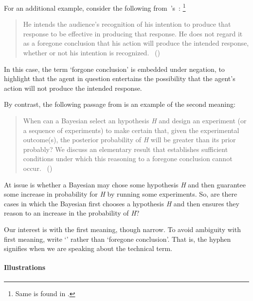 \begin{note}
  For an additional example, consider the following from~\citeauthor{Grice:1957vg}'s~:%
  \footnote{
    Same is found in \textcite[219]{Grice:1989uf}.
  }
  \begin{quote}
    He intends the audience's recognition of his intention to produce that response to be effective in producing that response.
    He does not regard it as a foregone conclusion that his action will produce the intended response, whether or not his intention is recognized.\newline
    \mbox{ }\hfill\mbox{(\citeyear[385]{Grice:1957vg})}
  \end{quote}

  In this case, the term `forgone conclusion' is embedded under negation, to highlight that the agent in question entertains the possibility that the agent's action will not produce the intended response.

  By contrast, the following passage from \textcite{Kadane:1996vu} is an example of the second meaning:

  \begin{quote}
    When can a Bayesian select an hypothesis \emph{H} and design an experiment (or a sequence of experiments) to make certain that, given the experimental outcome(s), the posterior probability of \emph{H} will be greater than its prior probably?
    We discuss an elementary result that establishes sufficient conditions under which this reasoning to a foregone conclusion cannot occur.%
    \mbox{ }\hfill\mbox{(\citeyear[1228]{Kadane:1996vu})}
  \end{quote}

  At issue is whether a Bayesian may chose some hypothesis \emph{H} and then guarantee some increase in probability for \emph{H} by running some experiments.
  So, are there cases in which the Bayesian first chooses a hypothesis \emph{H} and then ensures they reason to an increase in the probability of \emph{H}?
\end{note}

\begin{note}
  Our interest is with the first meaning, though narrow.
  To avoid ambiguity with first meaning, write `' rather than `foregone conclusion'.
  That is, the hyphen signifies when we are speaking about the technical term.
\end{note}

\paragraph{Illustrations}

